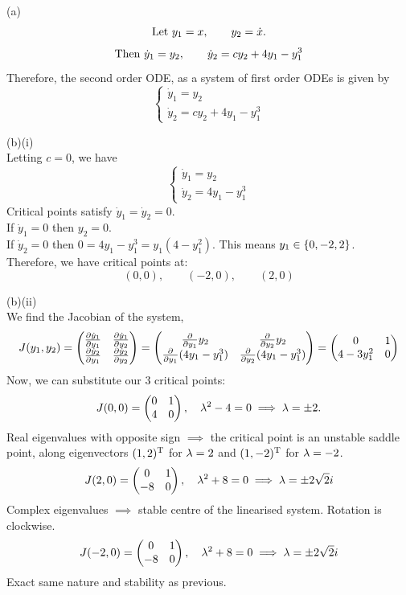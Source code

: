 \documentclass[a4paper,11pt]{report}
\begin{document}
\sol (a)
$$
  \text{Let } y_1 = x,\qquad y_2 = \dot{x}.
$$
$$
  \text{Then } \dot{y}_1 = y_2,\qquad \dot{y}_2 = cy_2 + 4y_1 - y_1^3
$$
Therefore, the second order ODE, as a system of first order ODEs is given by
$$
  \begin{cases}
    \dot{y}_1 = y_2 \\
    \dot{y}_2 = cy_2 + 4y_1 - y_1^3
  \end{cases}
$$

\sol (b)(i) \\
Letting $c=0$, we have
$$
  \begin{cases}
    \dot{y}_1 = y_2 \\
    \dot{y}_2 = 4y_1 - y_1^3
  \end{cases}
$$
Critical points satisfy $\dot{y}_1 = \dot{y}_2 = 0$. \\
If $\dot{y}_1 = 0$ then $y_2 = 0$. \\
If $\dot{y}_2 = 0$ then $0 = 4y_1 - y_1^3 = y_1(4 - y_1^2)$. This means $y_1\in\left\lbrace 0, -2, 2 \right\rbrace$. \\
Therefore, we have critical points at:
$$
  (0, 0),\qquad (-2,0),\qquad (2,0)
$$

\sol (b)(ii) \\
We find the Jacobian of the system,
$$
  J(y_1,y_2) = \begin{pmatrix} \frac{\partial \dot{y}_1}{\partial y_1} & \frac{\partial \dot{y}_1}{\partial y_2} \\ \frac{\partial \dot{y}_2}{\partial y_1} & \frac{\partial \dot{y}_2}{\partial y_2} \end{pmatrix} = \begin{pmatrix} \frac{\partial }{\partial y_1}y_2 & \frac{\partial }{\partial y_2}y_2 \\ \frac{\partial }{\partial y_1}(4y_1 - y_1^3) & \frac{\partial }{\partial y_2}(4y_1 - y_1^3) \end{pmatrix} = \begin{pmatrix} 0 & 1 \\ 4 - 3y_1^2 & 0 \end{pmatrix}
$$
Now, we can substitute our 3 critical points:
$$
  J(0,0) = \begin{pmatrix} 0 & 1 \\ 4 & 0 \end{pmatrix},\quad \lambda^2 - 4 = 0 \implies \lambda = \pm 2.
$$
Real eigenvalues with opposite sign $\implies$ the critical point is an unstable saddle point, along eigenvectors $(1,2)^{\mathrm{T}}$ for $\lambda=2$ and $(1,-2)^{\mathrm{T}}$ for $\lambda=-2$.
$$
  J(2,0) = \begin{pmatrix} 0 & 1 \\ -8 & 0 \end{pmatrix},\quad \lambda^2 + 8 = 0 \implies \lambda=\pm2\sqrt{2}i
$$
Complex eigenvalues $\implies$ stable centre of the linearised system. Rotation is clockwise.
$$
  J(-2,0) = \begin{pmatrix} 0 & 1 \\ -8 & 0 \end{pmatrix},\quad \lambda^2 + 8 = 0 \implies \lambda=\pm2\sqrt{2}i
$$
Exact same nature and stability as previous. \\
\end{document}
